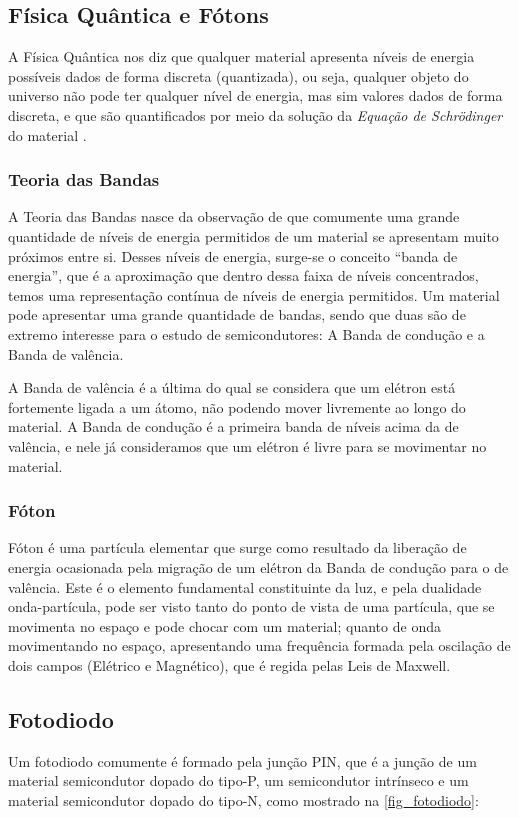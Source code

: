\subsection{Física Quântica e Fótons}
A Física Quântica nos diz que qualquer material apresenta níveis de energia possíveis dados de forma discreta (quantizada), ou seja, qualquer objeto do universo não pode ter qualquer nível de energia, mas sim valores dados de forma discreta, e que são quantificados por meio da solução da \textit{Equação de Schrödinger} do material \cite{Sze, JohnSingleton}.


\subsubsection{Teoria das Bandas}

A Teoria das Bandas nasce da observação de que comumente uma grande quantidade de níveis de energia permitidos de um material se apresentam muito próximos entre si. Desses níveis de energia, surge-se o conceito “banda de energia”, que \'e a aproximação que dentro dessa faixa de níveis concentrados, temos uma representação contínua de níveis de energia permitidos. Um material pode apresentar uma grande quantidade de bandas, sendo que duas são de extremo interesse para o estudo de semicondutores: A Banda de condução e a Banda de valência.

A Banda de valência \'e a última do qual se considera que um el\'etron está fortemente ligada a um átomo, não podendo mover livremente ao longo do material. A Banda de condução \'e a primeira banda de níveis acima da de valência, e nele já consideramos que um el\'etron \'e livre para se movimentar no material.

\subsubsection{Fóton}

Fóton \'e uma partícula elementar que surge como resultado da liberação de energia ocasionada pela migração de um el\'etron da Banda de condução para o de valência. Este \'e o elemento fundamental constituinte da luz, e pela dualidade onda-partícula, pode ser visto tanto do ponto de vista de uma partícula, que se movimenta no espaço e pode chocar com um material; quanto de onda movimentando no espaço, apresentando uma frequência formada pela oscilação de dois campos (El\'etrico e Magn\'etico), que \'e regida pelas Leis de Maxwell.

\subsection{Fotodiodo}
\label{secao_fotodiodo}
Um fotodiodo comumente \'e formado pela junção PIN, que \'e a junção de um material semicondutor dopado do tipo-P, um semicondutor intrínseco e um material semicondutor dopado do tipo-N, como mostrado na \autoref{fig_fotodiodo}:


